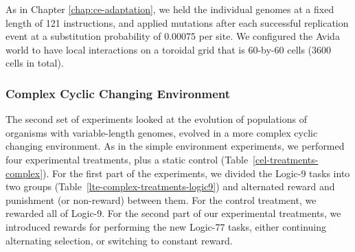 \documentclass[PhD]{msu-thesis}
\begin{document}
As in Chapter \ref{chap:ce-adaptation}, we held the individual genomes at a fixed length of 121 instructions, and applied mutations after each successful replication event at a substitution probability of 0.00075 per site.
We configured the Avida world to have local interactions on a toroidal grid that is 60-by-60 cells (3600 cells in total).

\subsubsection{Complex Cyclic Changing Environment}
The second set of experiments looked at the evolution of populations of organisms with variable-length genomes, 
evolved in a more complex cyclic changing environment. As in the simple environment experiments, we performed four experimental treatments, plus a static control (Table~\ref{cel-treatments-complex}). For the first part of the experiments, we divided the Logic-9 tasks into two groups (Table~\ref{lte-complex-treatments-logic9}) and alternated reward and punishment (or non-reward) between them. For the control treatment, we rewarded all of Logic-9. For the second part of our experimental treatments, we introduced rewards for performing the new Logic-77 tasks, either continuing alternating selection, or switching to constant reward. 
\end{document}
